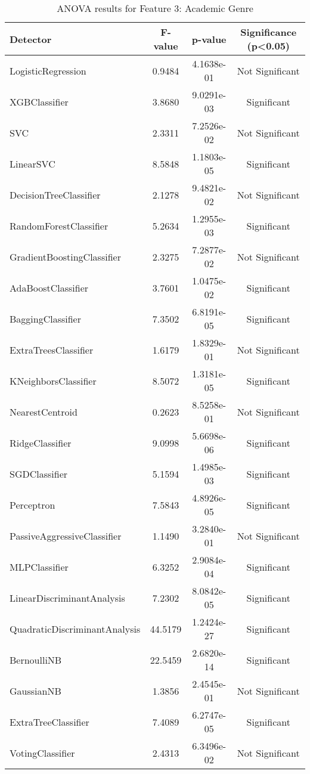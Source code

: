 \begin{table*}[htbp]
\centering
\small
\begin{tabular}{lccc}
\toprule
\textbf{Detector} & \textbf{F-value} & \textbf{p-value} & \textbf{Significance (p<0.05)} \\
\midrule
LogisticRegression             & 0.9484  & 4.1638e-01   & Not Significant \\
XGBClassifier                  & 3.8680  & 9.0291e-03   & Significant \\
SVC                            & 2.3311  & 7.2526e-02   & Not Significant \\
LinearSVC                      & 8.5848  & 1.1803e-05   & Significant \\
DecisionTreeClassifier         & 2.1278  & 9.4821e-02   & Not Significant \\
RandomForestClassifier         & 5.2634  & 1.2955e-03   & Significant \\
GradientBoostingClassifier     & 2.3275  & 7.2877e-02   & Not Significant \\
AdaBoostClassifier             & 3.7601  & 1.0475e-02   & Significant \\
BaggingClassifier              & 7.3502  & 6.8191e-05   & Significant \\
ExtraTreesClassifier           & 1.6179  & 1.8329e-01   & Not Significant \\
KNeighborsClassifier           & 8.5072  & 1.3181e-05   & Significant \\
NearestCentroid                & 0.2623  & 8.5258e-01   & Not Significant \\
RidgeClassifier                & 9.0998  & 5.6698e-06   & Significant \\
SGDClassifier                  & 5.1594  & 1.4985e-03   & Significant \\
Perceptron                     & 7.5843  & 4.8926e-05   & Significant \\
PassiveAggressiveClassifier    & 1.1490  & 3.2840e-01   & Not Significant \\
MLPClassifier                  & 6.3252  & 2.9084e-04   & Significant \\
LinearDiscriminantAnalysis     & 7.2302  & 8.0842e-05   & Significant \\
QuadraticDiscriminantAnalysis  & 44.5179 & 1.2424e-27   & Significant \\
BernoulliNB                    & 22.5459 & 2.6820e-14   & Significant \\
GaussianNB                     & 1.3856  & 2.4545e-01   & Not Significant \\
ExtraTreeClassifier            & 7.4089  & 6.2747e-05   & Significant \\
VotingClassifier               & 2.4313  & 6.3496e-02   & Not Significant \\
\bottomrule
\end{tabular}
\caption{ANOVA results for Feature 3: Academic Genre}
\end{table*}

